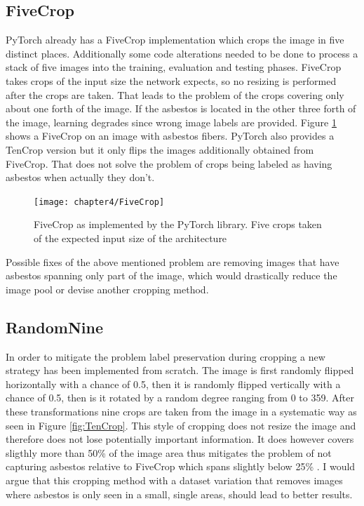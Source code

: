 \subsection{FiveCrop}

PyTorch already has a FiveCrop implementation which crops the image in five distinct places. Additionally some code alterations needed to be done to process a stack of five images into the training, evaluation and testing phases. FiveCrop takes crops of the input size the network expects, so no resizing is performed after the crops are taken. That leads to the problem of the crops covering only about one forth of the image. If the asbestos is located in the other three forth of the image, learning degrades since wrong image labels are provided. Figure \ref{fig:FiveCrop} shows a FiveCrop on an image with asbestos fibers. PyTorch also provides a TenCrop version but it only flips the images additionally obtained from FiveCrop. That does not solve the problem of crops being labeled as having asbestos when actually they don't.

\begin{figure}[H]
  \centering
  \caption{FiveCrop as implemented by the PyTorch library. Five crops taken of the expected input size of the architecture}
  \texttt{[image: chapter4/FiveCrop]}
  \label{fig:FiveCrop}
\end{figure}

Possible fixes of the above mentioned problem are removing images that have asbestos spanning only part of the image, which would drastically reduce the image pool or devise another cropping method.

\subsection{RandomNine}

In order to mitigate the problem label preservation during cropping a new strategy has been implemented from scratch. The image is first randomly flipped horizontally with  a chance of 0.5, then it is randomly  flipped vertically with a chance of 0.5, then is it rotated by a random degree ranging from 0 to 359. After these transformations nine crops are taken from the image in a systematic way as seen in Figure \ref{fig:TenCrop}. This style of cropping does not resize the image and therefore does not lose potentially important information. It does however covers sligthly more than 50\% of the image area thus mitigates the problem of not capturing asbestos relative to FiveCrop which spans slightly below 25\% . I would argue that this cropping method with a dataset variation that  removes images where asbestos is only seen in a small, single areas, should lead to better results.

